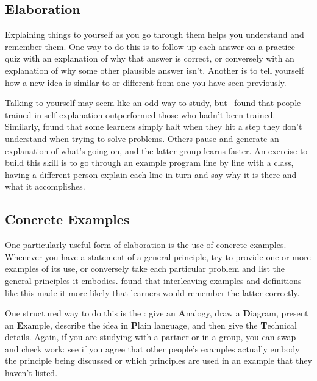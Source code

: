 \subsection*{Elaboration}

Explaining things to yourself as you go through them
helps you understand and remember them.
One way to do this is to follow up each answer on a practice quiz
with an explanation of why that answer is correct,
or conversely with an explanation of why some other plausible answer isn't.
Another is to tell yourself
how a new idea is similar to or different from one you have seen previously.

Talking to yourself may seem like an odd way to study,
but~\cite{Biel1995} found that
people trained in self-explanation outperformed those who hadn't been trained.
Similarly,
\cite{Chi1989} found that some learners simply halt when they hit a step they don't understand
when trying to solve problems.
Others pause and generate an explanation of what's going on,
and the latter group learns faster.
An exercise to build this skill is to go through an example program line by line with a class,
having a different person explain each line in turn
and say why it is there and what it accomplishes.

\subsection*{Concrete Examples}

One particularly useful form of elaboration is the use of concrete examples.
Whenever you have a statement of a general principle,
try to provide one or more examples of its use,
or conversely take each particular problem and list the general principles it embodies.
\cite{Raws2014} found that interleaving examples and definitions like this
made it more likely that learners would remember the latter correctly.

One structured way to do this is
the :
give an \textbf{A}nalogy,
draw a \textbf{D}iagram,
present an \textbf{E}xample,
describe the idea in \textbf{P}lain language,
and then give the \textbf{T}echnical details.
Again,
if you are studying with a partner or in a group,
you can swap and check work:
see if you agree that other people's examples actually embody the principle being discussed
or which principles are used in an example that they haven't listed.

